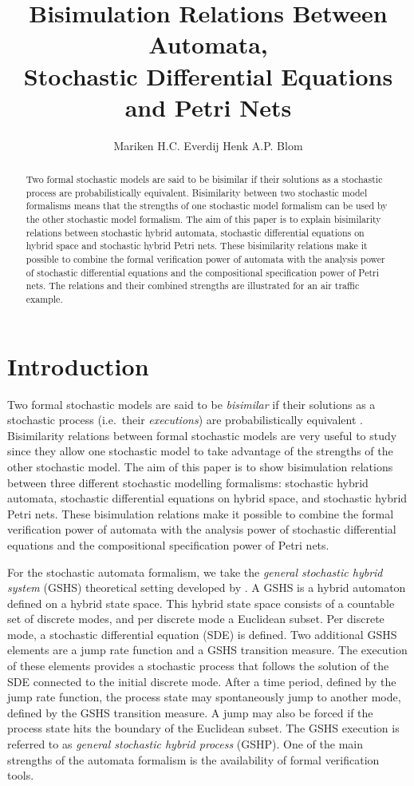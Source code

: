 \documentclass[copyright,creativecommons]{eptcs}
\title{Bisimulation Relations Between Automata, \\
Stochastic Differential Equations and Petri Nets}
\author{Mariken H.C. Everdij \qquad\qquad Henk A.P. Blom
\institute{National Aerospace Laboratory NLR\\ Amsterdam, Netherlands}
\email{everdij@nlr.nl \qquad\qquad blom@nlr.nl}
}
\begin{document}
\maketitle

\begin{abstract}
Two formal stochastic models are said to be bisimilar if their
solutions as a stochastic process are probabilistically
equivalent. Bisimilarity between two stochastic model formalisms
means that the strengths of one stochastic model formalism can be
used by the other stochastic model formalism. The aim of this
paper is to explain bisimilarity relations between stochastic
hybrid automata, stochastic differential equations on hybrid space
and stochastic hybrid Petri nets. These bisimilarity relations
make it possible to combine the formal verification power of
automata with the analysis power of stochastic differential
equations and the compositional specification power of Petri nets.
The relations and their combined strengths are illustrated for an
air traffic example.
\end{abstract}

\section{Introduction}\label{sec:introduction}
Two formal stochastic models are said to be
\emph{bisimilar} if their solutions as a stochastic process (i.e.\
their \emph{executions}) are probabilistically equivalent
\cite{BujorianuLygerosBujorianu2005,VanderSchaft2004}.
Bisimilarity relations between formal stochastic models are very
useful to study since they allow one stochastic model to take advantage
of the strengths of the other stochastic model. The aim of this paper is
to show bisimulation relations between three different stochastic modelling
formalisms: stochastic hybrid automata, stochastic differential
equations on hybrid space, and stochastic hybrid Petri nets. These bisimulation relations make it
possible to combine the formal verification power of automata with
the analysis power of stochastic differential equations and
the compositional specification power of Petri nets.

For the stochastic automata formalism, we take the \emph{general stochastic
hybrid system} (GSHS) theoretical setting developed by
\cite{BujorianuLygeros2006}. A GSHS is a hybrid automaton defined
on a hybrid state space. This hybrid state space consists of a
countable set of discrete modes, and per discrete mode a Euclidean
subset. Per discrete mode, a stochastic differential equation (SDE)
is defined. Two additional GSHS elements are a jump rate function and
a GSHS transition measure. The execution of these elements
provides a stochastic process that follows the solution of the
SDE connected to the initial discrete
mode. After a time period, defined by the jump rate function, the
process state may spontaneously jump to another mode, defined by
the GSHS transition measure. A jump may also be forced if the
process state hits the boundary of the Euclidean subset. The GSHS
execution is referred to as \emph{general stochastic hybrid
process} (GSHP). One of the main strengths of the automata
formalism is the availability of formal verification tools.
\end{document}
